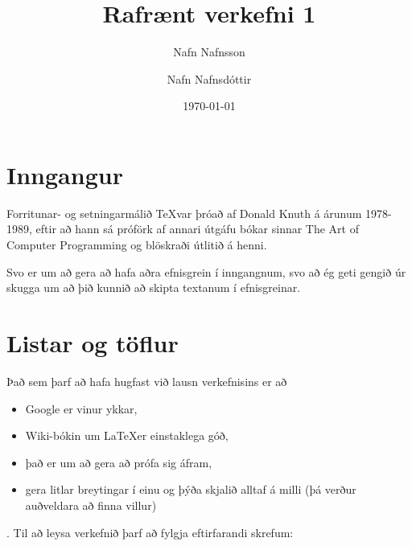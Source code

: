 \documentclass[11pt,a4paper]{article}
\theoremstyle{plain}
\theoremstyle{remark}
\begin{document}
\title{Rafrænt verkefni 1}
\author{Nafn Nafnsson \and Nafn Nafnsdóttir} 
\date{\today}
\maketitle

\section{Inngangur}
    Forritunar- og setningarmálið \TeX var þróað af Donald Knuth á árunum 1978-1989, eftir að hann sá próförk af annari útgáfu bókar sinnar The Art of Computer Programming og blöskraði útlitið á henni.

    Svo er um að gera að hafa aðra efnisgrein í inngangnum, svo að ég geti gengið úr skugga um að þið kunnið að skipta textanum í efnisgreinar.
\section{Listar og töflur}
    \label{sec:kafli2}
    Það sem þarf að hafa hugfast við lausn verkefnisins er að
         
\begin{itemize}
\item Google er vinur ykkar,
\item          Wiki-bókin um \LaTeX er einstaklega góð,
\item          það er um að gera að prófa sig áfram,
\item          gera litlar breytingar í einu og þýða skjalið alltaf á milli (þá verður auðveldara að finna villur)
\end{itemize}
.
    Til að leysa verkefnið þarf að fylgja eftirfarandi skrefum:
       
\end{document}
